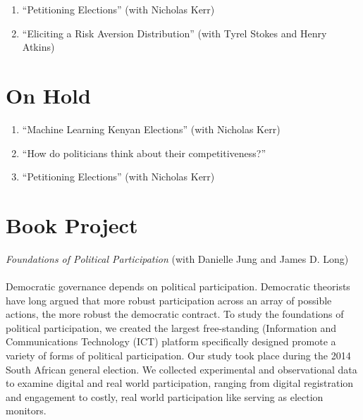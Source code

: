 \documentclass[margin,line]{res}
\begin{document}
{\begin{resume}
\begin{enumerate}
\item ``Petitioning Elections'' (with Nicholas Kerr)
 \item  ``Eliciting a Risk Aversion Distribution'' (with Tyrel Stokes
   and Henry Atkins)

\end{enumerate}

\section{\sc On Hold}
\renewcommand{\labelenumi}{MP\theenumi.}

\begin{enumerate}
\item ``Machine Learning Kenyan Elections'' (with Nicholas Kerr)
\item ``How do politicians think about their competitiveness?''
\item ``Petitioning Elections'' (with Nicholas Kerr)
\end{enumerate}


\section{\sc Book Project}
\emph{Foundations of Political Participation} (with Danielle Jung and
James D. Long)\\
\\
Democratic governance depends on political
 participation. Democratic theorists have long argued that more
  robust participation across an array of possible actions, the more
  robust the democratic contract. To study the foundations of
  political participation, we created the largest free-standing
  (Information and Communications Technology (ICT) platform
  specifically designed promote a variety of forms of political
  participation. Our study took place during the 2014 South African
  general election. We collected experimental and observational data
  to examine digital and real world participation, ranging from
  digital registration and engagement to costly, real world
  participation like serving as election monitors.



\end{resume}}
\end{document}

